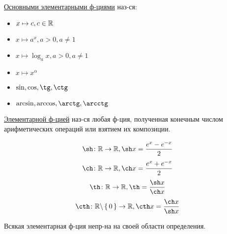 \begin{definition}
\underline{Основными элементарными ф-циями} наз-ся:
\begin{itemize}
  \item $x \mapsto c, c \in \mathbb{R}$
  \item $x \mapsto a^{x}, a > 0, a \neq 1$
  \item $x \mapsto \log_a x, a > 0, a \neq 1$
  \item $x \mapsto x^{\alpha}$
  \item $\sin, \cos, \tg, \ctg$
  \item $\arcsin, \arccos, \arctg, \arcctg$
\end{itemize}
\end{definition}
\begin{definition}
\underline{Элементарной ф-цией} наз-ся любая ф-ция, полученная конечным числом арифметических операций или взятием их композиции.
\end{definition}
\begin{example}
\[
\sh \colon \R \rightarrow \R, \sh x = \frac{e^{x} - e^{-x}}{2}
\]
\[
\ch \colon \R \rightarrow \R, \ch x = \frac{e^{x} + e^{-x}}{2}
\]
\[
  \th \colon \R \rightarrow \R, \th = \frac{\sh x}{\ch x}
\]
\[
\cth \colon \R \backslash \set{0} \rightarrow \R, \cth x = \frac{\ch x}{\sh x}
\]
\end{example}
\begin{theorem}
Всякая элементарная ф-ция непр-на на своей области определения.
\end{theorem}
